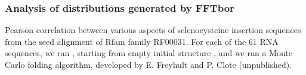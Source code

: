 \documentclass{beamer}
\begin{document}
\begin{frame}
  \frametitle{Analysis of distributions generated by FFTbor}
   \vspace{2em}

  \scriptsize Pearson correlation between various aspects of selenocysteine insertion sequences from the seed alignment of Rfam family RF00031. For each of the 61 RNA sequences, we ran \fftbor, starting from empty initial structure \strSt, and we ran a Monte Carlo folding algorithm, developed by E. Freyhult and P. Clote (unpublished).
\end{frame}
\end{document}
